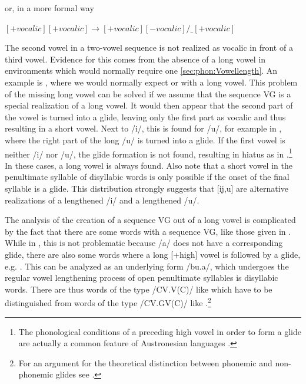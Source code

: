 or, in a more formal way

\ea\label{ex:phon:glide:threemorae:formal} $[+vocalic][+vocalic]\to[+vocalic][-vocalic]/\_[+vocalic]$ \z

The second vowel in a two-vowel sequence is not realized as vocalic in front of a third vowel. Evidence for this comes from the absence of a long vowel in environments which would normally require one \ref{sec:phon:Vowellength}. An example is , where we would normally expect  or  with a long vowel. This problem of the missing long vowel can be solved if we assume that the sequence VG is a special realization of a long vowel.
It would then appear that the second part of the vowel is turned into a glide, leaving only the first part as vocalic and thus resulting in a short vowel.
Next to /i/, this is found for /u/, for example in , where the right part of the long /u/ is turned into a glide.
If the first vowel is neither /i/ nor /u/, the glide formation is not found, resulting in hiatus as in .\footnote{The phonological conditions of a preceding high vowel in order to form a glide are actually a common feature of Austronesian languages \citep[116]{Himmelmann2005typochar}.} In these cases, a long vowel is always found. Also note that a short vowel in the penultimate syllable of  disyllabic words is only possible if the onset of the final syllable is a glide. This distribution strongly suggests that [ij,u\V] are alternative realizations of a lengthened /i/ and a lengthened /u/.

The analysis of the creation of a sequence VG out of a long vowel is complicated by the fact that there are some words with a sequence V\textipa{:}G, like those given in . While in , this is not problematic because /a/ does not have a corresponding glide, there are also some words where a long [+high] vowel is followed by a glide, e.g. . This can be analyzed as an underlying form /bu.\V a/, which undergoes the regular vowel lengthening process of open penultimate syllables is disyllabic words. There are thus words of the type /CV.V(C)/ like  which have to be distinguished from words of the type /CV.GV(C)/ like .\footnote{For an  argument for the theoretical distinction between phonemic and non-phonemic glides see \citet{Levi2008glides}.}

